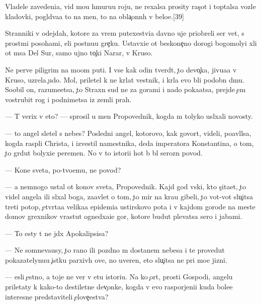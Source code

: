 \documentclass[10pt]{book}
\begin{document}
Vladele{\q} zavedeni{\y}a, vid{\ia} mo{\y}u hmuru{\y}u roju, ne rexalsa prosity ras{\c}ot i toptalsa vozle kladovki, pogl{\ia}d{\yi}va{\y}a to na men{\ia}, to na obla{\c}onn{\yi}h v belo{\y}e.[39]

Stranniki v odejdah, kotor{\yi}{\y}e za vrem{\ia} putexestvi{\y}a davno uje priobreli ser{\yi}{\y} {\q}vet, s prost{\yi}mi posohami, {\y}eli postnu{\y}u gre{\c}ku. Ustavxi{\y}e ot beskone{\c}no{\y} dorogi bogomoly{\q}i xli ot m{\yi}sa Del Sur, samo{\y} {\y}ujno{\y} to{\c}ki Narar{\yi}, v Kruso.

Ne perv{\yi}{\y}e piligrim{\yi} na mo{\y}om puti. I vse kak odin tverd{\ia}t, {\c}to devo{\c}ka, jivu{\x}a{\y}a v Kruso, uzrela {\c}udo. Mol, priletel k ne{\y} kr{\yi}lat{\yi}{\y} vestnik, i kr{\yi}l{\y}a {\y}evo b{\yi}li podobn{\yi} d{\yi}mu. Soob{\x}il on, razume{\y}etsa, {\c}to Straxn{\yi}{\y} sud ne za gorami i nado poka{\y}atsa, prejde {\c}em vostrubit rog i podnimetsa iz zemli prah.

— T{\yi} verix v eto? — sprosil u men{\ia} Propovednik, kogda m{\yi} tolyko usl{\yi}xali novosty.

— {\C}to angel sletel s nebes? Posledni{\y} angel, kotorovo, kak govor{\ia}t, videli, po{\y}avl{\ia}lsa, kogda rasp{\ia}li Christa, i izvestil namestnika, deda imperatora Konstantina, o tom, {\c}to gr{\ia}dut bolyxi{\y}e peremen{\yi}. No v to{\y} istori{\y}i hot{\ia} b{\yi} b{\yi}l ser{\y}ozn{\yi}{\y} povod.

— Kone{\q} sveta, po-tvo{\y}emu, ne povod?

— {\Y}a nemnogo ustal ot kon{\q}ov sveta, Propovednik. Kajd{\yi}{\y} god vs{\ia}ki{\y}, kto s{\c}ita{\y}et, {\c}to videl angela ili sl{\yi}xal boga, za{\y}avl{\ia}{\y}et o tom, {\c}to mir na kra{\y}u gibeli, {\c}to vot-vot slu{\c}itsa treti{\y} potop, {\c}etv{\e}rta{\y}a velika{\y}a epidemi{\y}a {\y}ustirskovo pota i v kajdom gorode na meste domov grexnikov v{\yi}rastut ogned{\yi}xa{\x}i{\y}e gor{\yi}, kotor{\yi}{\y}e budut plevatsa sero{\y} i jabami.

— To {\y}esty t{\yi} ne jd{\e}x Apokalipsisa?

— Ne somneva{\y}usy, {\c}to rano ili pozdno m{\yi} dostanem nebesa i te provedut pokazatelynu{\y}u {\c}istku parxiv{\yi}h ove{\q}, no uveren, eto slu{\c}itsa ne pri mo{\y}e{\y} jizni.

— {\Y}esli {\c}estno, {\y}a toje ne ver{\iu} v etu istori{\y}u. Na ko{\y} {\c}ort, prosti Gospodi, angelu priletaty k kako{\y}-to des{\ia}tiletne{\y} dev{\c}onke, kogda v {\y}evo raspor{\ia}jeni{\y}i kuda bole{\y}e interesn{\yi}{\y}e predstaviteli {\c}elove{\c}estva?
\end{document}
